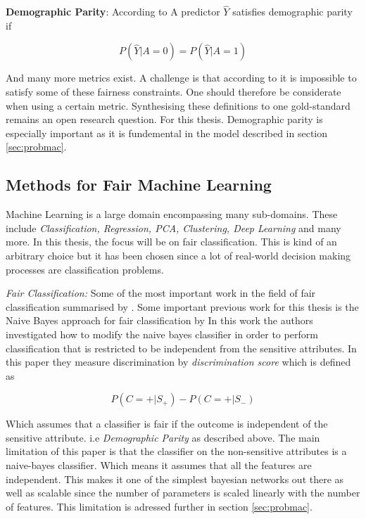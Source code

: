 {\textbf{Demographic Parity}: According to \citet{mehrabi2021survey, dwork2012} A predictor $\hat{Y}$ satisfies demographic parity if 

\begin{equation}
    P(\hat{Y}|A=0) = P(\hat{Y}|A=1)
\end{equation}

And many more metrics exist. A challenge is that according to \citet{mehrabi2021survey, kleinberg2016inherent} it is impossible to satisfy some of these fairness constraints. One should therefore be considerate when using a certain metric. Synthesising these definitions to one gold-standard remains an open research question. For this thesis. Demographic parity is especially important as it is fundemental in the model described in section \ref{sec:probmac}.

\subsection{Methods for Fair Machine Learning}

Machine Learning is a large domain encompassing many sub-domains. These include \textit{Classification, Regression, PCA, Clustering, Deep Learning} and many more. In this thesis, the focus will be on fair classification. This is kind of an arbitrary choice but it has been chosen since a lot of real-world decision making processes are classification problems. 

\textit{Fair Classification:} Some of the most important work in the field of fair classification summarised by \cite{mehrabi2021survey}. Some important previous work for this thesis is the Naive Bayes approach for fair classification by \citet{calders2010three} In this work the authors investigated how to modify the naive bayes classifier in order to perform classification that is restricted to be independent from the sensitive attributes. In this paper they measure discrimination by \textit{discrimination score} which is defined as

\begin{equation}
    P(C=+|S_+) - P(C=+|S_-)
\end{equation}

Which assumes that a classifier is fair if the outcome is independent of the sensitive attribute. i.e \textit{Demographic Parity} as described above. The main limitation of this paper is that the classifier on the non-sensitive attributes is a naive-bayes classifier. Which means it assumes that all the features are independent. This makes it one of the simplest bayesian networks out there as well as scalable since the number of parameters is scaled linearly with the number of features. This limitation is adressed further in section \ref{sec:probmac}.

}
